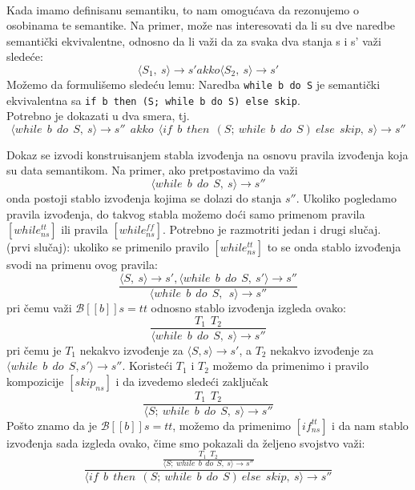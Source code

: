 \documentclass[../main.tex]{subfiles}
\begin{document}
\begin{boxprimer}[breakable]
\end{boxprimer}

 \\
Kada imamo definisanu semantiku, to nam omogućava da rezonujemo o osobinama te semantike. Na primer, može nas interesovati da li su dve naredbe semantički ekvivalentne, odnosno da li važi da za svaka dva stanja s i s' važi sledeće:
\[ \big \langle S_1,\ s \big \rangle \rightarrow s' akko \big \langle S_2,\ s \big \rangle \rightarrow s' \]
Možemo da formulišemo sledeću lemu: Naredba \texttt{while b do S} je semantički ekvivalentna sa \texttt{if b then (S; while b do S) else skip}.\\
Potrebno je dokazati u dva smera, tj.
\[
\big \langle while\ \ b\ \ do\ \ S,\ s \big \rangle \rightarrow s''
\ \ akko\ \ 
\big \langle if\ \ b\ \ then\ \ (S;\ while\ \ b\ \ do\ \ S)\ else\ \ skip,\ s \big \rangle \rightarrow s''
\]

Dokaz se izvodi konstruisanjem stabla  izvođenja na osnovu pravila izvođenja koja su data semantikom. Na primer, ako pretpostavimo da važi
\[ \big \langle while\ \ b\ \ do\ \ S,\ s \big \rangle \rightarrow s'' \]
onda postoji stablo izvođenja kojima se dolazi do stanja $s''$. Ukoliko pogledamo pravila izvođenja, do takvog stabla možemo doći samo primenom pravila $[while_{ns}^{tt}]$ ili pravila $[while_{ns}^{ff}]$. Potrebno je razmotriti jedan i drugi slučaj.
\\
(prvi slučaj): ukoliko se primenilo pravilo $[while_{ns}^{tt}]$ to se onda stablo izvođenja svodi na primenu ovog pravila:
\[ \frac{ \big \langle S,\  s\big \rangle \rightarrow s', \big \langle while\ \ b\ \ do\ \ S,\ s'\big \rangle \rightarrow s''}
	{ \big \langle while\ \ b\ \ do\ \ S,\ \ s \big \rangle \rightarrow s''} \]
pri čemu važi $\mathcal{B}[[b]]s=tt$ odnosno stablo izvođenja izgleda ovako:
\[ \frac{T_1\ \ T_2}
	{\big \langle while\ \ b\ \ do\ \ S,\ s \big \rangle \rightarrow s''}
\]
pri čemu je $T_1$ nekakvo izvođenje za $\big \langle S, s \big \rangle \rightarrow s'$, a  $T_2$ nekakvo izvođenje za $\big \langle while\ \ b\ \ do\ \  S, s' \big \rangle \rightarrow s''$. Koristeći $T_1$ i $T_2$ možemo da primenimo i pravilo kompozicije $[skip_{ns}]$ i da izvedemo sledeći zaključak
\[
\frac{T_1\ \ T_2}
	{\big \langle S;\ while\ \ b\ \ do\ \ S,\ s\big \rangle \rightarrow s''} 
\]
Pošto znamo da je $\mathcal{B}[[b]]s=tt$, možemo da primenimo $[if_{ns}^{tt}]$ i da nam stablo izvođenja sada izgleda ovako, čime smo pokazali da željeno svojstvo važi:
\[
\frac{\frac{T_1\ \ T_2}{\big \langle S;\ while\ \ b\ \ do\ \ S,\ s \big \rangle \rightarrow s''}}
{\big \langle if\ \ b\ \ then\ \ (S;\ while\ \ b\ \ do\ \ S)\ else\ \ skip,\ s \big \rangle \rightarrow s''}
\]
\end{document}

